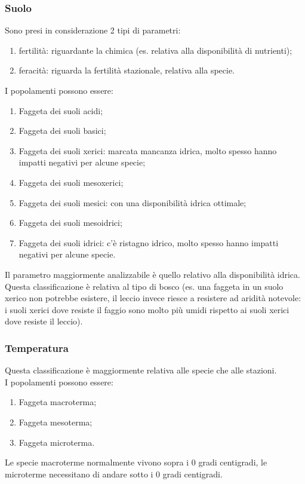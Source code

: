 \subsubsection{Suolo}
Sono presi in considerazione 2 tipi di parametri:
\begin{enumerate}[nosep]
    \item fertilità: riguardante la chimica (es. relativa alla disponibilità di nutrienti);
    \item feracità: riguarda la fertilità stazionale, relativa alla specie.
\end{enumerate}
I popolamenti possono essere:
\begin{enumerate}[nosep]
    \item Faggeta dei suoli acidi;
    \item Faggeta dei suoli basici;
    \item Faggeta dei suoli xerici: marcata mancanza idrica, molto spesso hanno impatti negativi per alcune specie;
    \item Faggeta dei suoli mesoxerici;
    \item Faggeta dei suoli mesici: con una disponibilità idrica ottimale;
    \item Faggeta dei suoli mesoidrici;
    \item Faggeta dei suoli idrici: c'è ristagno idrico, molto spesso hanno impatti negativi per alcune specie.
\end{enumerate}
Il parametro maggiormente analizzabile è quello relativo alla disponibilità idrica. Questa classificazione è relativa al tipo di bosco (es. una faggeta in un suolo xerico non potrebbe esistere, il leccio invece riesce a resistere ad aridità notevole: i suoli xerici dove resiste il faggio sono molto più umidi rispetto ai suoli xerici dove resiste il leccio).
\subsubsection{Temperatura}
Questa classificazione è maggiormente relativa alle specie che alle stazioni.\\
I popolamenti possono essere:
\begin{enumerate}[nosep]
    \item Faggeta macroterma;
    \item Faggeta mesoterma;
    \item Faggeta microterma.
\end{enumerate}
Le specie macroterme normalmente vivono sopra i 0 gradi centigradi, le microterme necessitano di andare sotto i 0 gradi centigradi.
